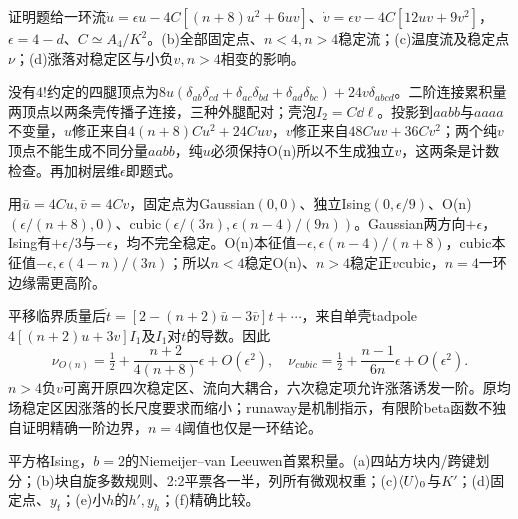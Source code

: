 \begin{exercise}[原题6(a)--(d)]\label{r:334-2-6}
证明题给一环流$\dot u=\epsilon u-4C[(n+8)u^2+6uv]$、$\dot v=\epsilon v-4C[12uv+9v^2]$，$\epsilon=4-d$、$C\simeq A_4/K^2$。(b)全部固定点、$n<4,n>4$稳定流；(c)温度流及稳定点$\nu$；(d)涨落对稳定区与小负$v,n>4$相变的影响。
\end{exercise}
\begin{solution}
没有$4!$约定的四腿顶点为$8u(\delta_{ab}\delta_{cd}+\delta_{ac}\delta_{bd}+\delta_{ad}\delta_{bc})+24v\delta_{abcd}$。二阶连接累积量两顶点以两条壳传播子连接，三种外腿配对；壳泡$I_2=C\dd\ell$。投影到$aabb$与$aaaa$不变量，$u$修正来自$4(n+8)Cu^2+24Cuv$，$v$修正来自$48Cuv+36Cv^2$；两个纯$v$顶点不能生成不同分量$aabb$，纯$u$必须保持O(n)所以不生成独立$v$，这两条是计数检查。再加树层维$\epsilon$即题式。
\begin{center}\end{center}
用$\bar u=4Cu,\bar v=4Cv$，固定点为Gaussian$(0,0)$、独立Ising$(0,\epsilon/9)$、O(n)$(\epsilon/(n+8),0)$、cubic$(\epsilon/(3n),\epsilon(n-4)/(9n))$。Gaussian两方向$+\epsilon$，Ising有$+\epsilon/3$与$-\epsilon$，均不完全稳定。O(n)本征值$-\epsilon,\epsilon(n-4)/(n+8)$，cubic本征值$-\epsilon,\epsilon(4-n)/(3n)$；所以$n<4$稳定O(n)、$n>4$稳定正$v$cubic，$n=4$一环边缘需更高阶。

平移临界质量后$\dot t=[2-(n+2)\bar u-3\bar v]t+\cdots$，来自单壳tadpole$4[(n+2)u+3v]I_1$及$I_1$对$t$的导数。因此
\begin{equation}
\nu_{O(n)}=\tfrac12+\frac{n+2}{4(n+8)}\epsilon+O(\epsilon^2),\quad
\nu_{cubic}=\tfrac12+\frac{n-1}{6n}\epsilon+O(\epsilon^2).
\end{equation}
$n>4$负$v$可离开原四次稳定区、流向大耦合，六次稳定项允许涨落诱发一阶。原均场稳定区因涨落的长尺度要求而缩小；runaway是机制指示，有限阶beta函数不独自证明精确一阶边界，$n=4$阈值也仅是一环结论。
\end{solution}
\begin{exercise}[原题7(a)--(f)]\label{r:334-2-7}
平方格Ising，$b=2$的Niemeijer--van Leeuwen首累积量。(a)四站方块内/跨键划分；(b)块自旋多数规则、2:2平票各一半，列所有微观权重；(c)$\langle U\rangle_0$与$K'$；(d)固定点、$y_t$；(e)小$h$的$h',y_h$；(f)精确比较。
\end{exercise}
